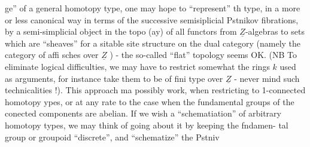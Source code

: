 ge'' of a general homotopy type, one may hope to ``represent'' th type,
in a more or less canonical way in terms of the successive semisiplicial
Pstnikov fibrations, by a semi-simplicial object in the topo (ay) of
all functors from $\underline{Z}$-algebras to sets which are ``sheaves'' for a sitable
site structure on the dual category (namely the category of affi
sches over $\underline{Z}$ ) - the so-called ``flat'' topology seems  OK. (NB To
eliminate logical difficulties, we may have to restrict somewhat the
rings $k$ used as arguments, for instance take them to be of fini type
over $\underline{Z}$ - never mind such technicalities !). This approach  ma
possibly work, when restricting to  1-connected homotopy ypes,
or at any rate to the case when the fundamental groups of the conected
\margin{*} components are abelian. If we wish a ``schematiation'' of arbitrary
homotopy types, we may think of going about it by keeping the fndamen-%
tal group or groupoid ``discrete'', and ``schematize'' the Pstniv


